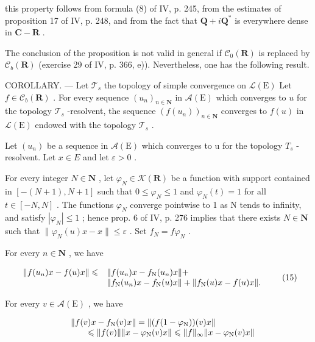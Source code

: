 this property follows from formula (8) of IV, p. 245, from the estimates of proposition 17 of IV, p. 248, and from the fact that \(\mathbf{Q} + i\mathbf{Q}^*\) is everywhere dense in \(\mathbf{C} - \mathbf{R}\) .

The conclusion of the proposition is not valid in general if \(\mathcal{C}_{0}(\mathbf{R})\) is replaced by \(\mathcal{C}_{b}(\mathbf{R})\) (exercise 29 of IV, p. 366, e)). Nevertheless, one has the following result.

COROLLARY. --- Let \(\mathcal{T}_{s}\) the topology of simple convergence on \(\mathcal{L}(\mathrm{E})\) Let \(f \in \mathcal{C}_{b}(\mathbf{R})\) . For every sequence \((u_{n})_{n \in \mathbf{N}}\) in \(\mathcal{A}(\mathrm{E})\) which converges to \(u\) for the topology \(\mathcal{T}_{s}\) -resolvent, the sequence \((f(u_{n}))_{n \in \mathbf{N}}\) converges to \(f(u)\) in \(\mathcal{L}(\mathrm{E})\) endowed with the topology \(\mathcal{T}_{s}\) .

Let \((u_{n})\) be a sequence in \(\mathcal{A}(\mathrm{E})\) which converges to u for the topology \(T_{s}\) -resolvent. Let \(x \in E\) and let \(\varepsilon > 0\) .

For every integer \(N \in \mathbf{N}\) , let \(\varphi_{N} \in \mathcal{K}(\mathbf{R})\) be a function with support contained in \([-(N+1), N+1]\) such that \(0 \leqslant \varphi_{N} \leqslant 1\) and \(\varphi_{N}(t) = 1\) for all \(t \in [-N, N]\) . The functions \(\varphi_{N}\) converge pointwise to 1 as N tends to infinity, and satisfy \(|\varphi_{N}| \leqslant 1\) ; hence prop. 6 of IV, p. 276 implies that there exists \(N \in \mathbf{N}\) such that \(\|\varphi_{N}(u)x - x\| \leqslant \varepsilon\) . Set \(f_{N} = f\varphi_{N}\) .

For every \(n\in \mathbf{N}\) , we have

\[
\begin{array}{r l} \| f (u _ {n}) x - f (u) x \| \leqslant & \| f (u _ {n}) x - f _ {\mathrm{N}} (u _ {n}) x \| + \\ & \| f _ {\mathrm{N}} (u _ {n}) x - f _ {\mathrm{N}} (u) x \| + \| f _ {\mathrm{N}} (u) x - f (u) x \|. \end{array} \tag {15}
\]

For every \(v\in \mathcal{A}(\mathrm{E})\) , we have

\[
\begin{array}{r l} & {\| f (v) x - f _ {\mathrm{N}} (v) x \| = \| (f (1 - \varphi_ {\mathrm{N}})) (v) x \|} \\ & {\qquad \leqslant \| f (v) \|   \| x - \varphi_ {\mathrm{N}} (v) x \| \leqslant \| f \| _ {\infty}   \| x - \varphi_ {\mathrm{N}} (v) x \|} \end{array}
\]

